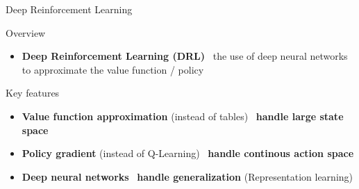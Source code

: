 \documentclass[presentation, 9pt]{beamer}\mode<presentation>{\usetheme{AMSBolognaFC}}
\begin{document}
\begin{frame}{Deep Reinforcement Learning}
	\centering
	\begin{block}{Overview}
		\begin{itemize}
			\item \textbf{Deep Reinforcement Learning (DRL)} \faArrowRight \, the use of deep neural networks to approximate the value function / policy
		\end{itemize}
	\end{block}
	
	\begin{alertblock}{Key features}
		\begin{itemize}
			\item \textbf{Value function approximation} (instead of tables) \faArrowRight \, \textbf{handle large state space}
			\item \textbf{Policy gradient} (instead of Q-Learning) \faArrowRight \, \textbf{handle continous action space}
			\item \textbf{Deep neural networks} \faArrowRight \, \textbf{handle generalization} (Representation learning)
		\end{itemize}
	\end{alertblock}
\end{frame}
\end{document}
